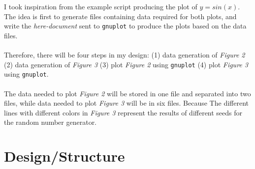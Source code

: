 \documentclass[12pt]{article}
\begin{document}
I took inspiration from the example script producing the plot of $y = sin(x)$. The idea is first to generate files containing data required for both plots, and write the \textit{here-document} sent to \texttt{gnuplot} to produce the plots based on the data files. \\
\\
Therefore, there will be four steps in my design: (1) data generation of \textit{Figure 2} (2) data generation of \textit{Figure 3} (3) plot \textit{Figure 2} using \texttt{gnuplot} (4) plot \textit{Figure 3} using \texttt{gnuplot}. \\
\\
The data needed to plot \textit{Figure 2} will be stored in one file and separated into two files, while data needed to plot \textit{Figure 3} will be in six files. Because The different lines with different colors in \textit{Figure 3} represent the results of different seeds for the random number generator. \\

\section{Design/Structure}
\end{document}
